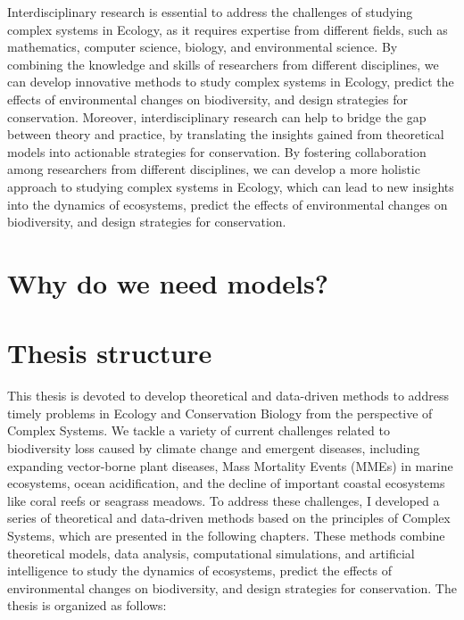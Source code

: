 Interdisciplinary research is essential to address the challenges of studying
complex systems in Ecology, as it requires expertise from different fields,
such as mathematics, computer science, biology, and environmental science. By
combining the knowledge and skills of researchers from different disciplines,
we can develop innovative methods to study complex systems in Ecology, predict
the effects of environmental changes on biodiversity, and design strategies for
conservation. Moreover, interdisciplinary research can help to bridge the gap
between theory and practice, by translating the insights gained from
theoretical
models into actionable strategies for conservation. By fostering collaboration
among researchers from different disciplines, we can develop a more holistic
approach to studying complex systems in Ecology, which can lead to new insights
into the dynamics of ecosystems, predict the effects of environmental changes
on
biodiversity, and design strategies for conservation.

\section{\label{sec:Why do we need models?} Why do we need models?}

\section{\label{sec:Thesis structure} Thesis structure}

This thesis is devoted to develop theoretical and data-driven methods to
address timely problems in Ecology and Conservation Biology from the
perspective of Complex Systems. We tackle a variety of current challenges
related to biodiversity loss caused by climate change and emergent diseases,
including expanding vector-borne plant diseases, Mass Mortality Events (MMEs)
in marine ecosystems, ocean acidification, and the decline of important coastal
ecosystems like coral reefs or seagrass meadows. To address these challenges, I
developed a series of theoretical and data-driven methods based on the
principles of Complex Systems, which are presented in the following chapters.
These methods combine theoretical models, data analysis, computational
simulations, and artificial intelligence to study the dynamics of ecosystems,
predict the effects of environmental changes on biodiversity, and design
strategies for conservation. The thesis is organized as follows:
